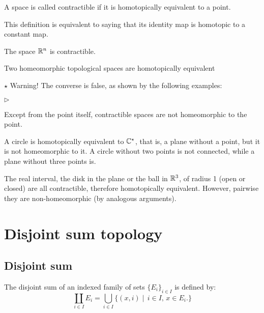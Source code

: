 \begin{definition}\label{D:contractible}
A space is called contractible if it is homotopically equivalent to a point.
\end{definition}
This definition is equivalent to saying that its identity map is homotopic to a constant map.

\begin{example}
The space $\mathbb{R}^{n}$ is contractible.
\end{example}

\begin{theorem}
Two homeomorphic topological spaces are homotopically equivalent
\end{theorem}

$\star$ Warning! The converse is false, as shown by the following examples:

\begin{list}{$\triangleright$}{}
\item Except  from the point itself, contractible spaces are not homeomorphic to the point.
\item A circle is homotopically equivalent to $\mathbb{C}^{\star}$, that is, a plane without a point, but it is not homeomorphic to it. A circle without two points is not connected, while a plane without three points is.
\item The real interval, the disk in the plane or the ball in $\mathbb{R}^{3}$, of radius 1 (open or closed) are all  contractible, therefore homotopically equivalent. However,  pairwise they are non-homeomorphic (by analogous arguments).
\end{list}


\section{Disjoint sum topology}

\subsection{Disjoint sum}
\begin{definition}\label{somdisj}

The disjoint sum of an indexed family of sets $\{E_i\}_{i\in I}$ is defined
by:
\begin{equation}
\coprod_{i\in I}E_{i}=\bigcup_{i\in I} \{(x,i) \mid\, i\in I, \,x\in E_i.\}
\end{equation}
\end{definition}

